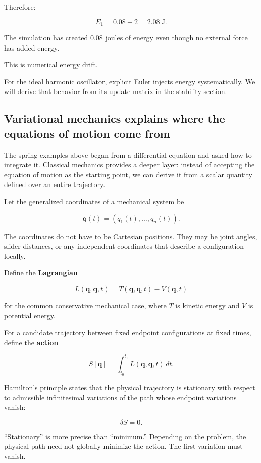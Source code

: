 Therefore:

\[
E_1=0.08+2=\boxed{2.08\ \mathrm J}.
\]

The simulation has created \(0.08\) joules of energy even though no external force has added energy.

This is numerical energy drift.

For the ideal harmonic oscillator, explicit Euler injects energy systematically. We will derive that behavior from its update matrix in the stability section.

\subsection{Variational mechanics explains where the equations of motion come from}\label{02-foundations-ii-ch025-variational-mechanics-explains-where-the-equations-of-motion-come-from}

The spring examples above began from a differential equation and asked how to integrate it. Classical mechanics provides a deeper layer: instead of accepting the equation of motion as the starting point, we can derive it from a scalar quantity defined over an entire trajectory.

Let the generalized coordinates of a mechanical system be

\[
\mathbf q(t)
=
(q_1(t),\ldots,q_n(t)).
\]

The coordinates do not have to be Cartesian positions. They may be joint angles, slider distances, or any independent coordinates that describe a configuration locally.

Define the \textbf{Lagrangian}

\[
\boxed{
L(\mathbf q,\dot{\mathbf q},t)
=
T(\mathbf q,\dot{\mathbf q},t)
-
V(\mathbf q,t)
}
\]

for the common conservative mechanical case, where \(T\) is kinetic energy and \(V\) is potential energy.

For a candidate trajectory between fixed endpoint configurations at fixed times, define the \textbf{action}

\[
\boxed{
S[\mathbf q]
=
\int_{t_0}^{t_1}
L(\mathbf q,\dot{\mathbf q},t)\,dt
}.
\]

Hamilton's principle states that the physical trajectory is stationary with respect to admissible infinitesimal variations of the path whose endpoint variations vanish:

\[
\delta S=0.
\]

``Stationary'' is more precise than ``minimum.'' Depending on the problem, the physical path need not globally minimize the action. The first variation must vanish.

